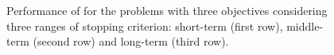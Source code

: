 \begin{figure}[t]
\begin{tabular}{l}
\end{tabular}
\caption{Performance of \MOEAS{} for the problems with three objectives considering three ranges of stopping criterion: short-term (first row), middle-term (second row) and long-term (third row).}\label{fig:Performance_time_3obj}
\end{figure}
